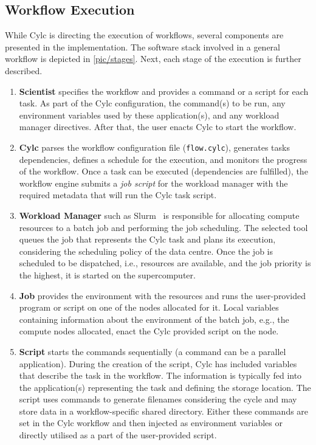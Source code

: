 \documentclass{superfri}
\begin{document}
\subsection{Workflow Execution}

While Cylc is directing the execution of workflows, several components are presented in the implementation.
The software stack involved in a general workflow is depicted in \cref{pic/stages}.
Next, each stage of the execution is further described.


\begin{enumerate}

  \item \textbf{Scientist} specifies the workflow and provides a command or a script for each task.
  As part of the Cylc configuration, the command(s) to be run, any environment variables used by these application(s), and any workload manager directives.
  After that, the user enacts Cylc to start the workflow.

  \item \textbf{Cylc} parses the workflow configuration file (\texttt{flow.cylc}), generates tasks dependencies, defines a schedule for the execution, and monitors the progress of the workflow.
  Once a task can be executed (dependencies are fulfilled), the workflow engine submits a \textit{job script} for the workload manager with the required metadata that will run the Cylc task script.

  \item \textbf{Workload Manager} such as Slurm~\cite{Jette02slurm:simple} is responsible for allocating compute resources to a batch job and performing the job scheduling.
  The selected tool queues the job that represents the Cylc task and plans its execution, considering the scheduling policy of the data centre.
  Once the job is scheduled to be dispatched, i.e., resources are available, and the job priority is the highest, it is started on the supercomputer.

  \item \textbf{Job} provides the environment with the resources and runs the user-provided program or script on one of the nodes allocated for it.
  Local variables containing information about the environment of the batch job, e.g., the compute nodes allocated, enact the Cylc provided script on the node.

  \item \textbf{Script} starts the commands sequentially (a command can be a parallel application).
  During the creation of the script, Cylc has included variables that describe the task in the workflow.
  The information is typically fed into the application(s) representing the task and defining the storage location.
  The script uses commands to generate filenames considering the cycle and may store data in a workflow-specific shared directory.
  Either these commands are set in the Cylc workflow and then injected as environment variables or directly utilised as a part of the user-provided script.


\end{enumerate}
\end{document}
